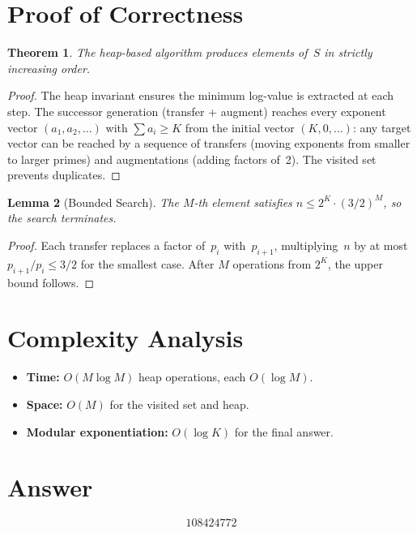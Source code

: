 \documentclass[11pt]{article}
\newtheorem{theorem}{Theorem}
\newtheorem{lemma}[theorem]{Lemma}
\begin{document}
\section{Proof of Correctness}

\begin{theorem}
The heap-based algorithm produces elements of~$S$ in strictly increasing order.
\end{theorem}

\begin{proof}
The heap invariant ensures the minimum log-value is extracted at each step. The successor generation (transfer + augment) reaches every exponent vector $(a_1, a_2, \ldots)$ with $\sum a_i \ge K$ from the initial vector $(K, 0, \ldots)$: any target vector can be reached by a sequence of transfers (moving exponents from smaller to larger primes) and augmentations (adding factors of~2). The visited set prevents duplicates.
\end{proof}

\begin{lemma}[Bounded Search]
The $M$-th element satisfies $n \le 2^K \cdot (3/2)^M$, so the search terminates.
\end{lemma}

\begin{proof}
Each transfer replaces a factor of~$p_i$ with~$p_{i+1}$, multiplying~$n$ by at most $p_{i+1}/p_i \le 3/2$ for the smallest case. After $M$ operations from $2^K$, the upper bound follows.
\end{proof}

\section{Complexity Analysis}

\begin{itemize}
\item \textbf{Time:} $O(M \log M)$ heap operations, each $O(\log M)$.
\item \textbf{Space:} $O(M)$ for the visited set and heap.
\item \textbf{Modular exponentiation:} $O(\log K)$ for the final answer.
\end{itemize}

\section{Answer}

\[
\boxed{108424772}
\]
\end{document}
